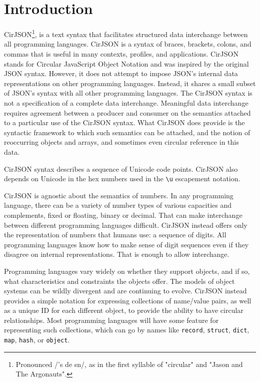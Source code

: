 
\chapter*{Introduction}

CirJSON\footnote{Pronounced /'s{\textrevepsilon\textrhoticity} d{\textyogh}e{\textsci} s{\textschwa}n/, as in the first syllable of "circular" and "Jason and The Argonauts".}, is a text syntax that facilitates structured data interchange between all programming languages.
CirJSON is a syntax of braces, brackets, colons, and commas that is useful in many contexts, profiles, and applications.
CirJSON stands for Circular JavaScript Object Notation and was inspired by the original JSON syntax.
However, it does not attempt to impose JSON's internal data representations on other programming languages.
Instead, it shares a small subset of JSON's syntax with all other programming languages.
The CirJSON syntax is not a specification of a complete data interchange.
Meaningful data interchange requires agreement between a producer and consumer on the semantics attached to a particular use of the CirJSON syntax.
What CirJSON does provide is the syntactic framework to which such semantics can be attached, and the notion of reoccurring objects and arrays, and sometimes even circular reference in this data.

CirJSON syntax describes a sequence of Unicode code points.
CirJSON also depends on Unicode in the hex numbers used in the \texttt{{\textbackslash}u} escapement notation.

CirJSON is agnostic about the semantics of numbers.
In any programming language, there can be a variety of number types of various capacities and complements, fixed or floating, binary or decimal.
That can make interchange between different programming languages difficult.
CirJSON instead offers only the representation of numbers that humans use: a sequence of digits.
All programming languages know how to make sense of digit sequences even if they disagree on internal representations.
That is enough to allow interchange.

Programming languages vary widely on whether they support objects, and if so, what characteristics and constraints the objects offer.
The models of object systems can be wildly divergent and are continuing to evolve.
CirJSON instead provides a simple notation for expressing collections of name/value pairs, as well as a unique ID for each different object, to provide the ability to have circular relationships.
Most programming languages will have some feature for representing such collections, which can go by names like \texttt{record}, \texttt{struct}, \texttt{dict}, \texttt{map}, \texttt{hash}, or \texttt{object}.

